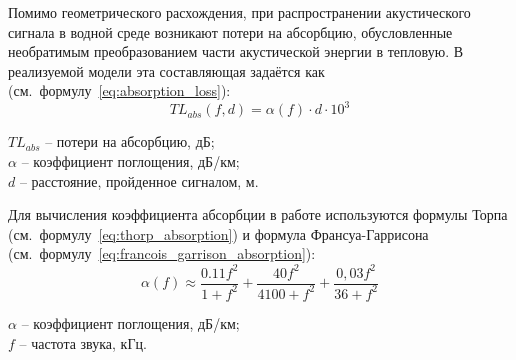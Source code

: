 \documentclass[
    numbers=section,
    document-code={ВКРБ--09.03.04--10.19--XX--26--81}
]{../latex/fqw}
\begin{document}
    Помимо геометрического расхождения, при распространении акустического сигнала в водной среде
    возникают потери на абсорбцию, обусловленные необратимым преобразованием части акустической энергии в тепловую.
    В реализуемой модели эта составляющая задаётся как
    (см.~формулу~\eqref{eq:absorption_loss}):
    \begin{equation}
        {TL}_{abs}(f,d) = \alpha(f) \cdot d \cdot 10^{3}
        \label{eq:absorption_loss}
    \end{equation}
    \begin{FqwWhere}
        \({TL}_{abs}\) -- потери на абсорбцию, дБ;\\
        \(\alpha\) -- коэффициент поглощения, дБ/км;\\
        \(d\) -- расстояние, пройденное сигналом, м.
    \end{FqwWhere}

    Для вычисления коэффициента абсорбции в работе используются формулы
    Торпа (см.~формулу~\eqref{eq:thorp_absorption}) и
    формула Франсуа-Гаррисона (см.~формулу~\eqref{eq:francois_garrison_absorption}):
    \begin{equation}
        \alpha(f) \approx
        \frac{0.11f^{2}}{1 + f^{2}} +
        \frac{40f^{2}}{4100 + f^{2}} +
        \frac{0,03f^{2}}{36 + f^{2}}
        \label{eq:thorp_absorption}
    \end{equation}
    \begin{FqwWhere}
        \(\alpha\) -- коэффициент поглощения, дБ/км;\\
        \(f\) -- частота звука, кГц.
    \end{FqwWhere}
\end{document}
